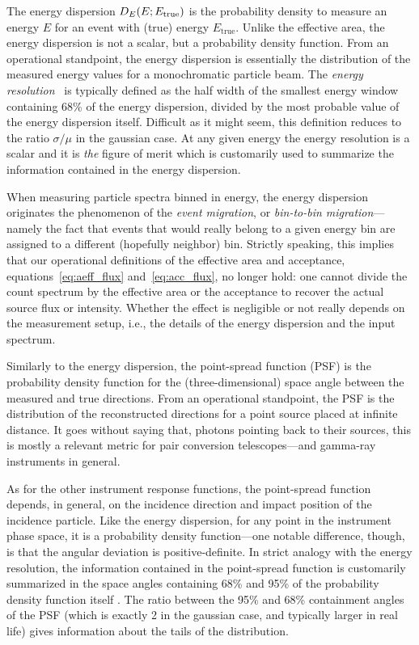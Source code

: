 The energy dispersion $D_E(E; E_\text{true})$ is the probability density to
measure an energy $E$ for an event with (true) energy $E_\text{true}$. Unlike the
effective area, the energy dispersion is not a scalar, but a probability density
function. From an operational standpoint, the energy dispersion is essentially the
distribution of the measured energy values for a monochromatic particle beam.
The \emph{energy resolution} \eresl\ is typically defined as the half width of the
smallest energy window containing 68\% of the energy dispersion, divided by the
most probable value of the energy dispersion itself. Difficult as it might seem,
this definition reduces to the ratio $\sigma/\mu$ in the gaussian case.
At any given energy the energy resolution is a scalar and it is \emph{the}
figure of merit which is customarily used to summarize the information
contained in the energy dispersion.

When measuring particle spectra binned in energy, the energy dispersion
originates the phenomenon of the \emph{event migration}, or
\emph{bin-to-bin migration}---namely the fact that events that would really
belong to a given energy bin are assigned to a different (hopefully neighbor)
bin. Strictly speaking, this implies that our operational definitions of
the effective area and acceptance, equations~\eqref{eq:aeff_flux}
and~\eqref{eq:acc_flux}, no longer hold: one cannot divide the count spectrum
by the effective area or the acceptance to recover the actual source flux
or intensity. Whether the effect is negligible or not really depends on the
measurement setup, i.e., the details of the energy dispersion and the
input spectrum.

Similarly to the energy dispersion, the point-spread function (PSF) is the
probability density function for the (three-dimensional) space angle between
the measured and true directions. From an operational standpoint, the PSF
is the distribution of the reconstructed directions for a point source placed
at infinite distance. It goes without saying that, photons pointing back to
their sources, this is mostly a relevant metric for pair conversion
telescopes---and gamma-ray instruments in general.

As for the other instrument response functions, the point-spread function
depends, in general, on the incidence direction and impact position of the
incidence particle. Like the energy dispersion, for any point in the
instrument phase space, it is a probability density function---one notable
difference, though, is that the angular deviation is positive-definite.
In strict analogy with the energy resolution, the information contained in the
point-spread function is customarily summarized in the space angles containing
68\% and 95\% of the probability density function itself%
.
The ratio between the 95\% and 68\% containment angles of the PSF (which is
exactly 2 in the gaussian case, and typically larger in real life) gives
information about the tails of the distribution.



